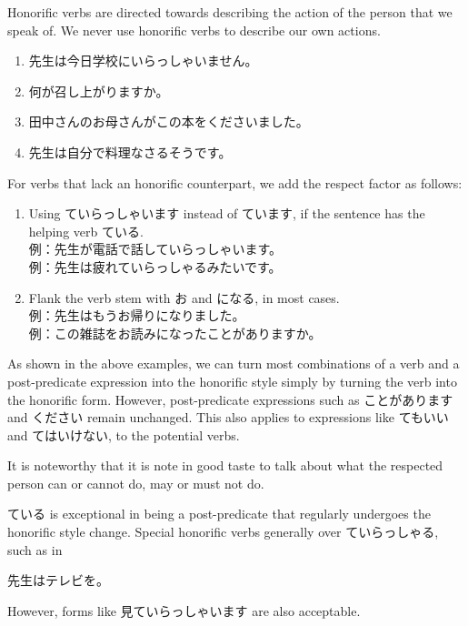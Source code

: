 \documentclass[notoc,notitlepage]{tufte-book}
\begin{document}
\begin{warning}
  Honorific verbs are directed towards describing the action
  of the person that we speak of.
  We never use honorific verbs to describe our own actions.
\end{warning}

\begin{eg}
  \begin{enumerate}
    \item 先生は今日学校にいらっしゃいません。
    \item 何が召し上がりますか。
    \item 田中さんのお母さんがこの本をくださいました。
    \item 先生は自分で料理なさるそうです。
  \end{enumerate}
\end{eg}

\begin{note}
  For verbs that lack an honorific counterpart,
  we add the respect factor as follows:
  \begin{enumerate}
    \item Using ていらっしゃいます instead of ています,
      if the sentence has the helping verb ている. \\
      例：先生が電話で話していらっしゃいます。\\
      例：先生は疲れていらっしゃるみたいです。
    \item Flank the verb stem with お and になる,
      in most cases. \\
      例：先生はもうお帰りになりました。 \\
      例：この雑誌をお読みになったことがありますか。
  \end{enumerate}
\end{note}

\begin{note}
  As shown in the above examples,
  we can turn most combinations of a verb and a post-predicate expression
  into the honorific style simply by turning the verb into the honorific form.
  However, post-predicate expressions such as
  ことがあります and ください remain unchanged.
  This also applies to expressions like てもいい and てはいけない,
  to the potential verbs.

  It is noteworthy that it is note in good taste to talk about what
  the respected person can or cannot do, may or must not do.

  ている is exceptional in being a post-predicate that regularly undergoes the
  honorific style change.
  Special honorific verbs generally  over
  ていらっしゃる, such as in
  \begin{center}
    先生はテレビを。
  \end{center}
  However, forms like 見ていらっしゃいます are also acceptable.
\end{note}
\end{document}
